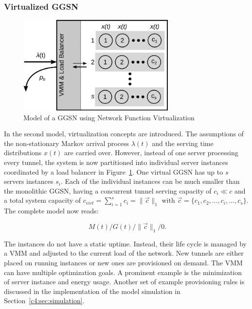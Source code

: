 \subsubsection{Virtualized \texorpdfstring{\acrshort{GGSN}}{GGSN}}
\label{c4:sec:virtual_ggsn}

\begin{figure}[htb]
	\centering
	\includegraphics[width=0.7\textwidth]{images/ggsn-virtualized.pdf}
	\caption{Model of a GGSN using Network Function Virtualization}
\label{c4:fig:model-ggsn-virtualized}
\end{figure}

In the second model, virtualization concepts are introduced. The assumptions of the non-stationary Markov arrival process $\lambda(t)$ and the serving time distributions $x(t)$ are carried over. However, instead of one server processing every tunnel, the system is now partitioned into individual server instances coordinated by a load balancer in Figure~\ref{c4:fig:model-ggsn-virtualized}. One virtual \gls{GGSN} has up to $s$ servers instances $s_i$. Each of the individual instances can be much smaller than the monolithic \gls{GGSN}, having a concurrent tunnel serving capacity of $c_i \ll c$ and a total system capacity of $c_{virt} = \sum_{i=1}^{s} c_i = \| \overrightarrow{c}\|_1 \text{ with } \overrightarrow{c} = \{c_1, c_2, \ldots ,c_i, \ldots ,c_s\}$. %
The complete model now reads:

\begin{equation}
\phantom{.}M(t)/G(t)/\|\overrightarrow{c}\|_1/0\text{.}
\end{equation}

The instances do not have a static uptime. Instead, their life cycle is managed by a \gls{VMM} and adjusted to the current load of the network. New tunnels are either placed on running instances or new ones are provisioned on demand. The \gls{VMM} can have multiple optimization goals. A prominent example is the minimization of server instance and energy usage.  Another set of example provisioning rules is discussed in the implementation of the model simulation in Section~\ref{c4:sec:simulation}. 

